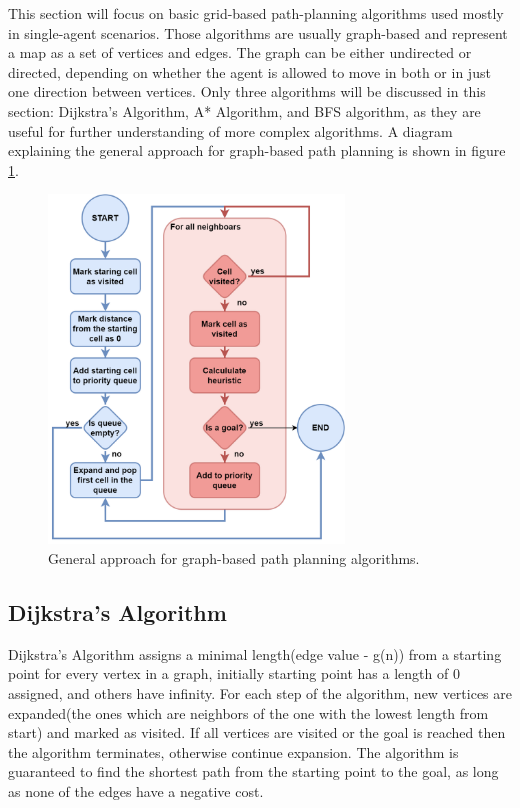 
This section will focus on basic grid-based path-planning algorithms used mostly in single-agent scenarios. Those algorithms are usually graph-based and represent a map as a set of vertices and edges. The graph can be either undirected or directed, depending on whether the agent is allowed to move in both or in just one direction between vertices\cite{basic_algorithms}. Only three algorithms will be discussed in this section: Dijkstra's Algorithm, A* Algorithm, and BFS algorithm, as they are useful for further understanding of more complex algorithms. A diagram explaining the general approach for graph-based path planning is shown in figure \ref{fig:simple_path_planning}. 

\begin{figure}[H]
    \centering
    \includegraphics[width=0.7\textwidth]{pictures/simple_algos.png}
    \caption{General approach for graph-based path planning algorithms. }
    \label{fig:simple_path_planning}
\end{figure}


\subsection{Dijkstra's Algorithm}
Dijkstra's Algorithm assigns a minimal length(edge value - g(n)) from a starting point for every vertex in a graph, initially starting point has a length of 0 assigned, and others have infinity. For each step of the algorithm, new vertices are expanded(the ones which are neighbors of the one with the lowest length from start) and marked as visited. If all vertices are visited or the goal is reached then the algorithm terminates, otherwise continue expansion\cite{basic_algorithms}. The algorithm is guaranteed to find the shortest path from the starting point to the goal, as long as none of the edges have a negative cost\cite{basic_2}.

